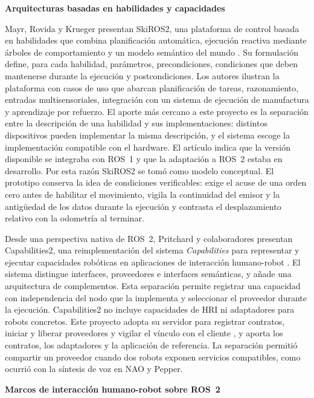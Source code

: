 \documentclass[11pt,letterpaper]{article}
\begin{document}
\par\medskip\noindent\textbf{Arquitecturas basadas en habilidades y capacidades}\par

Mayr, Rovida y Krueger presentan SkiROS2, una plataforma de control basada en habilidades que combina planificación automática, ejecución reactiva mediante árboles de comportamiento y un modelo semántico del mundo \cite{skiros}. Su formulación define, para cada habilidad, parámetros, precondiciones, condiciones que deben mantenerse durante la ejecución y postcondiciones. Los autores ilustran la plataforma con casos de uso que abarcan planificación de tareas, razonamiento, entradas multisensoriales, integración con un sistema de ejecución de manufactura y aprendizaje por refuerzo. El aporte más cercano a este proyecto es la separación entre la descripción de una habilidad y sus implementaciones: distintos dispositivos pueden implementar la misma descripción, y el sistema escoge la implementación compatible con el hardware. El artículo indica que la versión disponible se integraba con ROS~1 y que la adaptación a ROS~2 estaba en desarrollo. Por esta razón SkiROS2 se tomó como modelo conceptual. El prototipo conserva la idea de condiciones verificables: exige el acuse de una orden cero antes de habilitar el movimiento, vigila la continuidad del emisor y la antigüedad de los datos durante la ejecución y contrasta el desplazamiento relativo con la odometría al terminar.

Desde una perspectiva nativa de ROS~2, Pritchard y colaboradores presentan Capabilities2, una reimplementación del sistema \emph{Capabilities} para representar y ejecutar capacidades robóticas en aplicaciones de interacción humano-robot \cite{capabilities2}. El sistema distingue interfaces, proveedores e interfaces semánticas, y añade una arquitectura de complementos. Esta separación permite registrar una capacidad con independencia del nodo que la implementa y seleccionar el proveedor durante la ejecución. Capabilities2 no incluye capacidades de HRI ni adaptadores para robots concretos. Este proyecto adopta su servidor para registrar contratos, iniciar y liberar proveedores y vigilar el vínculo con el cliente \cite{capabilities2repo}, y aporta los contratos, los adaptadores y la aplicación de referencia. La separación permitió compartir un proveedor cuando dos robots exponen servicios compatibles, como ocurrió con la síntesis de voz en NAO y Pepper.

\par\medskip\noindent\textbf{Marcos de interacción humano-robot sobre ROS~2}\par
\end{document}
